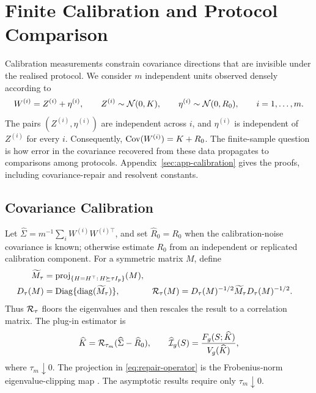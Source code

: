 \section{Finite Calibration and Protocol Comparison}
\label{sec:estimation}

Calibration measurements constrain covariance directions that are invisible
under the realised protocol. We consider $m$ independent units observed densely
according to
\begin{equation}
W^{(i)}=Z^{(i)}+\eta^{(i)},\qquad
Z^{(i)}\sim\mathcal{N}(0,K),\qquad \eta^{(i)}\sim\mathcal{N}(0,R_0),
\qquad i=1,\dots,m.
\label{eq:calibration}
\end{equation}
The pairs $(Z^{(i)},\eta^{(i)})$ are independent across $i$, and
$\eta^{(i)}$ is independent of $Z^{(i)}$ for every $i$. Consequently,
$\operatorname{Cov}(W^{(i)})=K+R_0$.
The finite-sample question is how error in the covariance recovered from these
data propagates to comparisons among protocols. Appendix~\ref{sec:app-calibration}
gives the proofs, including covariance-repair and resolvent constants.

\subsection{Covariance Calibration}

Let $\widehat\Sigma=m^{-1}\sum_iW^{(i)}W^{(i)\top}$, and set
$\widehat R_0=R_0$ when the calibration-noise covariance is known;
otherwise estimate $R_0$ from an independent or replicated calibration
component. For a symmetric matrix $M$, define
\begin{equation}
\begin{aligned}
\widetilde M_\tau
&=\operatorname{proj}_{\{H=H^\top:\,H\succeq\tau I_p\}}(M),\\
D_\tau(M)&=\operatorname{Diag}\{\operatorname{diag}(\widetilde M_\tau)\},&
\mathcal{R}_\tau(M)&=D_\tau(M)^{-1/2}\widetilde M_\tau D_\tau(M)^{-1/2}.
\end{aligned}
\label{eq:repair-operator}
\end{equation}
Thus $\mathcal{R}_\tau$ floors the eigenvalues and then rescales the result to a
correlation matrix. The plug-in estimator is
\begin{equation}
\widehat K=\mathcal{R}_{\tau_m}(\widehat\Sigma-\widehat R_0),
\qquad
\widehat{\mathcal{I}}_g(S)=\frac{F_g(S;\widehat K)}{V_g(\widehat K)},
\label{eq:plugin}
\end{equation}
where $\tau_m\downarrow0$. The projection in
\eqref{eq:repair-operator} is the Frobenius-norm eigenvalue-clipping map
\citep{higham1988computing}. The asymptotic results require only
$\tau_m\downarrow0$.

